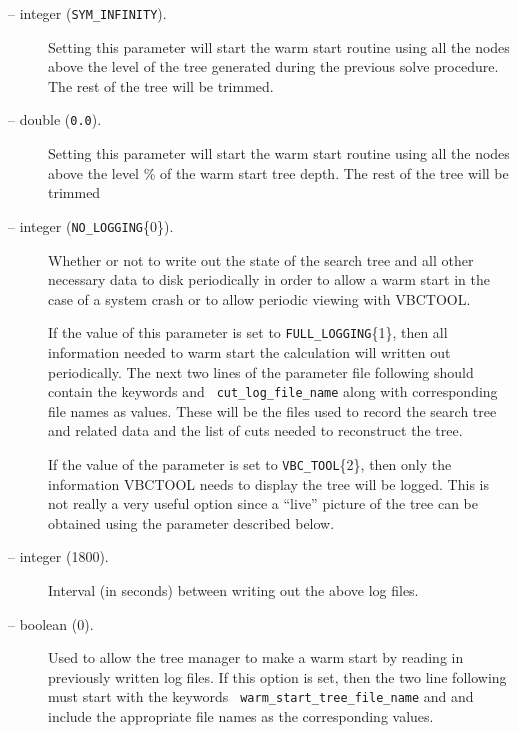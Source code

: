 \begin{description}
\item[ -- integer ({\tt SYM\_INFINITY}).]
Setting this parameter will start the warm start routine using all the
nodes above the level  of the 
tree generated during the previous solve procedure. The rest of the tree 
will be trimmed. 

\item[ -- double ({\tt 0.0}).]
Setting this parameter will start the warm start routine using all the
nodes above the level \% of the 
warm start tree depth. The rest of the tree will be trimmed

\item[ -- integer ({\tt NO\_LOGGING}\{0\}).] 
Whether or not to write out the state of the search tree and all other
necessary data to disk periodically in order to allow a warm start in
the case of a system crash or to allow periodic viewing with VBCTOOL.

If the value of this parameter is set to {\tt FULL\_LOGGING}\{1\},
then all information needed to warm start the calculation will written
out periodically. The next two lines of the parameter file following
should contain the keywords  and {\tt
cut\_log\_file\_name} along with corresponding file names as values.
These will be the files used to record the search tree and related
data and the list of cuts needed to reconstruct the tree.

If the value of the parameter is set to {\tt VBC\_TOOL}\{2\}, then
only the information VBCTOOL needs to display the tree will be
logged. This is not really a very useful option since a ``live'' picture
of the tree can be obtained using the  parameter
described below.

\item[ -- integer (1800).] 
Interval (in seconds) between writing out the above log files.

\item[ -- boolean (0).] 
Used to allow the tree manager to make a warm start by reading in
previously written log files. If this option is set, then the two line
following must start with the keywords {\tt
warm\_start\_tree\_file\_name} and 
and include the appropriate file names as the corresponding values.


\end{description}
